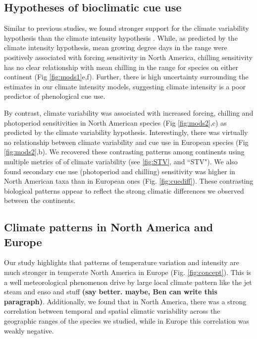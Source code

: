 \documentclass[12pt]{article}\usepackage[]{graphicx}\usepackage[]{color}
\begin{document}
\subsection*{Hypotheses of bioclimatic cue use}
Similar to previous studies, we found stronger support for the climate variability hypothesis than the climate intensity hypothesis \citep{Zohner:2017aa}. While, as predicted by the climate intensity hypothesis, mean growing degree days in the range were positively associated with forcing sensitivity in North America, chilling sensitivity has no clear relationship with mean chilling in the range for species on either continent (Fig \ref{fig:mods1}e,f).  Further, there is high uncertainty surrounding the estimates in our climate intensity models, suggesting climate intensity is a poor predictor of phenological cue use.

\noindent By contrast, climate variability was associated with increased forcing, chilling and photoperiod sensitivities in North American species (Fig \ref{fig:mods2},c) as predicted by the climate variability hypothesis. Interestingly, there was virtually no relationship between climate variability and cue use in European species (Fig \ref{fig:mods2},b). We recovered these contrasting patterns among continents using multiple metrics of of climate variability (see \ref{fig:STV}, and ``STV"). We also found secondary cue use (photoperiod and chilling) sensitivity was higher in North American taxa than in European ones (Fig. \ref{fig:cuediff}). These contrasting biological patterns appear to reflect the strong climatic differences we observed between the continents.

\subsection*{Climate patterns in North America and Europe}
Our study highlights that patterns of temperature variation and intensity are much stronger in temperate North America in Europe (Fig. \ref{fig:concept}). This is a well meteorological phenomenon drive by large local climate pattern like the jet steam and enso and stuff \textbf{(say better. maybe, Ben can write this paragraph)}. Additionally, we found that in North America, there was a strong correlation between temporal and spatial climatic variability across the geographic ranges of the species we studied, while in Europe this correlation was weakly negative.
\end{document}
